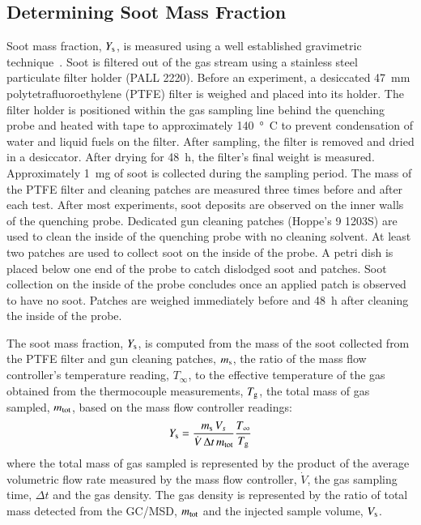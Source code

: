 \documentclass[preprint,review,12pt]{elsarticle}
\begin{document}
\subsection{Determining Soot Mass Fraction}
\label{ssec:Soot_Setup}
Soot mass fraction, $Y_{\rm s}$, is measured using a well established gravimetric technique~\cite{Choi1995}. Soot is filtered out of the gas stream using a stainless steel particulate filter holder (PALL 2220). Before an experiment, a desiccated \SI{47}{mm} polytetrafluoroethylene (PTFE) filter is weighed and placed into its holder. The filter holder is positioned within the gas sampling line behind the quenching probe and heated with tape to approximately \SI{140}{\degree C} to prevent condensation of water and liquid fuels on the filter. After sampling, the filter is removed and dried in a desiccator. After drying for 48~h, the filter’s final weight is measured. Approximately \SI{1}{mg} of soot is collected during the sampling period. The mass of the PTFE filter and cleaning patches are measured three times before and after each test. After most experiments, soot deposits are observed on the inner walls of the quenching probe. Dedicated gun cleaning patches (Hoppe's 9 1203S) are used to clean the inside of the quenching probe with no cleaning solvent. At least two patches are used to collect soot on the inside of the probe. A petri dish is placed below one end of the probe to catch dislodged soot and patches. Soot collection on the inside of the probe concludes once an applied patch is observed to have no soot. Patches are weighed immediately before and 48~h after cleaning the inside of the probe.

The soot mass fraction, $Y_{\rm s}$, is computed from the mass of the soot collected from the PTFE filter and gun cleaning patches, $m_{\rm s}$, the ratio of the mass flow controller's temperature reading, $T_{\infty}$, to the effective temperature of the gas obtained from the thermocouple measurements, $T_{\rm g}$, the total mass of gas sampled, $m_{\rm tot}$, based on the mass flow controller readings:
\begin{equation}\label{eq:overall_soot_mass_frac}
Y_{\rm s}= \frac{m_{\rm s} \, V_{s}}{\dot{V} \, \Delta t \, m_{\rm tot}}\frac{T_{\rm \infty}}{T_{\rm g}}
\end{equation}
where the total mass of gas sampled is represented by the product of the average volumetric flow rate measured by the mass flow controller, $\dot{V}$, the gas sampling time, $\Delta t$ and the gas density. The gas density is represented by the ratio of total mass detected from the GC/MSD, $m_{\rm tot}$ and the injected sample volume, $V_{\rm s}$.
\end{document}
